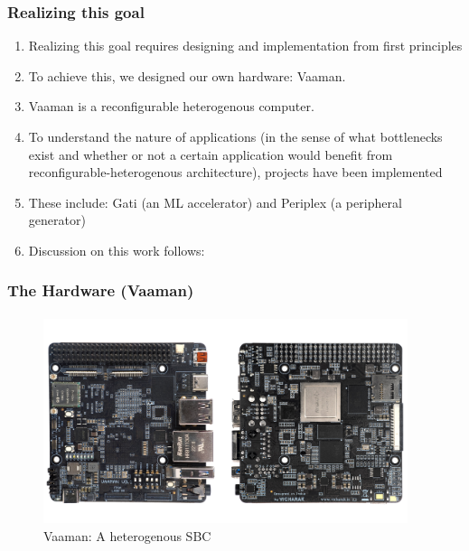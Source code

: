 \documentclass{beamer}
\begin{document}
\begin{frame}[fragile]
  \frametitle{Realizing this goal}
  \begin{enumerate}
    \item Realizing this goal requires designing and implementation from
      first principles
    \item To achieve this, we designed our own hardware: Vaaman. 
    \item Vaaman is a reconfigurable heterogenous computer.
    \item To understand the nature of applications (in the sense of what
      bottlenecks exist and whether or not a certain application would
      benefit from reconfigurable-heterogenous architecture), projects have been implemented
    \item These include: Gati (an ML accelerator) and Periplex (a peripheral
      generator)
    \item Discussion on this work follows:
  \end{enumerate}
  \framesubtitle{}
\end{frame}

\begin{frame}[fragile]
  \frametitle{The Hardware (Vaaman)}
  \framesubtitle{}
  \begin{figure}
    \centering
    \includegraphics[width=0.95\textwidth]{vaaman.jpg}
    \caption{Vaaman: A heterogenous SBC}
    \label{neuron}
  \end{figure}
\end{frame}
\end{document}
